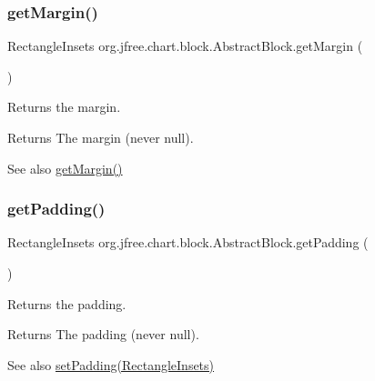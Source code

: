 \subsubsection{\texorpdfstring{get\+Margin()}{getMargin()}}
{\footnotesize\ttfamily Rectangle\+Insets org.\+jfree.\+chart.\+block.\+Abstract\+Block.\+get\+Margin (\begin{DoxyParamCaption}{ }\end{DoxyParamCaption})}

Returns the margin.

\begin{DoxyReturn}{Returns}
The margin (never {\ttfamily null}).
\end{DoxyReturn}
\begin{DoxySeeAlso}{See also}
\mbox{\hyperlink{classorg_1_1jfree_1_1chart_1_1block_1_1_abstract_block_a31c97bb88e5c0e55a444f8b93e9c0ca8}{get\+Margin()}} 
\end{DoxySeeAlso}
\mbox{\label{classorg_1_1jfree_1_1chart_1_1block_1_1_abstract_block_ac5c667ddd4fdec045fd55f400aa5adb0}} 
\subsubsection{\texorpdfstring{get\+Padding()}{getPadding()}}
{\footnotesize\ttfamily Rectangle\+Insets org.\+jfree.\+chart.\+block.\+Abstract\+Block.\+get\+Padding (\begin{DoxyParamCaption}{ }\end{DoxyParamCaption})}

Returns the padding.

\begin{DoxyReturn}{Returns}
The padding (never {\ttfamily null}).
\end{DoxyReturn}
\begin{DoxySeeAlso}{See also}
\mbox{\hyperlink{classorg_1_1jfree_1_1chart_1_1block_1_1_abstract_block_a36bd3bfe0f4696d0fd4f488260b0b0fc}{set\+Padding(\+Rectangle\+Insets)}} 
\end{DoxySeeAlso}
\mbox{\label{classorg_1_1jfree_1_1chart_1_1block_1_1_abstract_block_a0279de7c0fa1a68e5dec365d5fabaea6}} 

